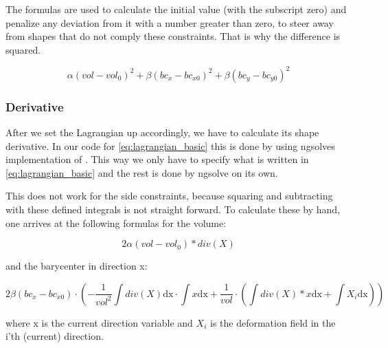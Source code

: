 The formulas are used to calculate the initial value (with the subscript zero) and penalize any deviation from it with a number greater than zero, to steer away from shapes that do not comply these constraints. That is why the difference is squared.

\begin{equation}\label{eq:lagrangian_constraints}
	\alpha (vol-vol_0)^2 + \beta (bc_x-bc_{x0})^2 + \beta (bc_y-bc_{y0})^2
\end{equation}

\subsubsection{Derivative}
After we set the Lagrangian up accordingly, we have to calculate its shape derivative.
In our code for \ref{eq:lagrangian_basic} this is done by using ngsolves implementation of . This way we only have to specify what is written in \ref{eq:lagrangian_basic} and the rest is done by ngsolve on its own.

This does not work for the side constraints, because squaring and subtracting with these defined integrals is not straight forward.
To calculate these by hand, one arrives at the following formulas for the volume:

\begin{equation}\label{eq:constraints_vol}
	2\alpha (vol-vol_0)*div(X)
\end{equation}

and the barycenter in direction x:

\begin{equation}\label{eq:constraints_bc}
	2\beta (bc_x-bc_{x0})\cdot\left(-\frac{1}{vol^2}\int div(X)\mathrm{dx} \cdot \int x \mathrm{dx} + \frac{1}{vol} \cdot (\int div(X)*x \mathrm{dx} + \int X_i\mathrm{dx})\right)
\end{equation}

where x is the current direction variable and $X_i$ is the deformation field in the i'th (current) direction.


